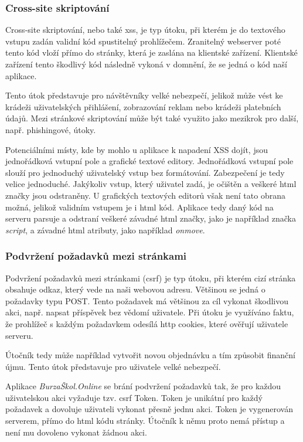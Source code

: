 \subsubsection{Cross-site skriptování}

Cross-site skriptování\cite{xss}, nebo také \acrshort{xss}, je typ útoku, při kterém je do textového vstupu zadán validní kód spustitelný prohlížečem. Zranitelný webserver poté tento kód vloží přímo do stránky, která je zaslána na klientské zařízení. Klientské zařízení tento škodlivý kód následně vykoná v domnění, že se jedná o kód naší aplikace.

Tento útok představuje pro návštěvníky velké nebezpečí, jelikož může vést ke krádeži uživatelských přihlášení, zobrazování reklam nebo krádeži platebních údajů.
Mezi stránkové skriptování\cite{xss} může být také využito jako mezikrok pro další, např. phishingové\cite{phishing}, útoky.

Potenciálními místy, kde by mohlo u aplikace \bso k napadení XSS dojít, jsou jednořádková vstupní pole a grafické textové editory. Jednořádková vstupní pole slouží pro jednoduchý uživatelský vstup bez formátování. Zabezpečení je tedy velice jednoduché. Jakýkoliv vstup, který uživatel zadá, je očištěn a veškeré \acrshort{html} značky jsou odstraněny. U grafických textových editorů však není tato obrana možná, jelikož validním vstupem je i \acrshort{html} kód. Aplikace tedy daný kód na serveru parsuje a odstraní veškeré závadné \acrshort{html} značky, jako je například značka \emph{script}, a závadné \acrshort{html} atributy, jako například \emph{onmove}.

\subsubsection{Podvržení požadavků mezi stránkami}

Podvržení požadavků mezi stránkami (\acrshort{csrf}) \cite{csrf} je typ útoku, při kterém cizí stránka obsahuje odkaz, který vede na naši webovou adresu. Většinou se jedná o požadavky typu POST. Tento požadavek má většinou za cíl vykonat škodlivou akci, např. napsat příspěvek bez vědomí uživatele. Při útoku je využíváno faktu, že prohlížeč s každým požadavkem odesílá \acrshort{http} cookies, které ověřují uživatele serveru.

Útočník tedy může například vytvořit novou objednávku a tím způsobit finanční újmu. Tento útok představuje pro uživatele velké nebezpečí.

Aplikace \emph{BurzaŠkol.Online} se brání podvržení požadavků tak, že pro každou uživatelskou akci vyžaduje tzv. \acrshort{csrf} Token\cite{csrf}. Token je unikátní pro každý požadavek a dovoluje uživateli vykonat přesně jednu akci. Token je vygenerován serverem, přímo do \acrshort{html} kódu stránky. Útočník k němu proto nemá přístup a není mu dovoleno vykonat žádnou akci.


